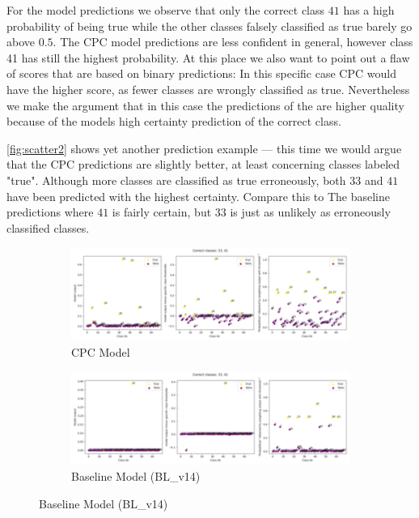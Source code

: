 For the  model predictions we observe that only the correct class $41$ has a high probability of being true while the other classes falsely classified as true barely go above $0.5$. The CPC model predictions are less confident in general, however class 41 has still the highest probability. At this place we also want to point out a flaw of scores that are based on binary predictions: In this specific case CPC would have the higher score, as fewer classes are wrongly classified as true. Nevertheless we make the argument that in this case the predictions of the  are higher quality because of the models high certainty prediction of the correct class.

\autoref{fig:scatter2} shows yet another prediction example --- this time we would argue that the CPC predictions are slightly better, at least concerning classes labeled "true". Although more classes are classified as true erroneously, both $33$ and $41$ have been predicted with the highest certainty. Compare this to The baseline predictions where $41$ is fairly certain, but $33$ is just as unlikely as erroneously classified classes.
\begin{figure}
	\caption{Scatterplots showing from left to right: exact model predictions, model predictions minus specific class thresholds, reweighted prediction probabilities}
	\begin{subfigure}[t]{0.95\textwidth}\centering
		\includegraphics[width=1\linewidth]{bilder/HR04811scatterplot-predictions(combined).png}
		\caption{CPC Model}
	\end{subfigure}	
	\begin{subfigure}[t]{0.95\textwidth}\centering
		\includegraphics[width=1\linewidth]{bilder/HR04811scatterplot-predictions(combined)bl14.png}
		\caption{Baseline Model (BL\_v14)}
	\end{subfigure}%
	\label{fig:scatter2}
\end{figure}

